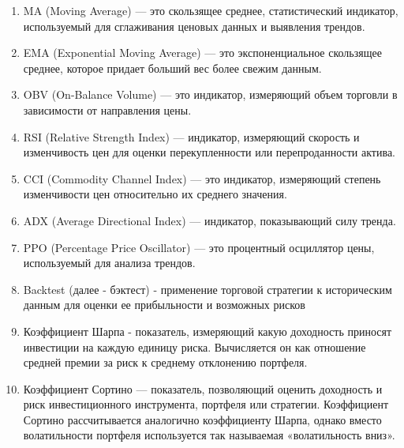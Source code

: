 \documentclass[a4paper,14pt]{extarticle}
\begin{document}
\begin{enumerate}
\item MA (Moving Average) — это скользящее среднее, статистический индикатор, используемый для сглаживания ценовых данных и выявления трендов.
\item EMA (Exponential Moving Average) — это экспоненциальное скользящее среднее, которое придает больший вес более свежим данным.
\item OBV (On-Balance Volume) — это индикатор, измеряющий объем торговли в зависимости от направления цены.
\item RSI (Relative Strength Index) — индикатор, измеряющий скорость и изменчивость цен для оценки перекупленности или перепроданности актива.
\item CCI (Commodity Channel Index) — это индикатор, измеряющий степень изменчивости цен относительно их среднего значения.
\item ADX (Average Directional Index) — индикатор, показывающий силу тренда.
\item PPO (Percentage Price Oscillator) — это процентный осциллятор цены, используемый для анализа трендов.
\item Backtest (далее - бэктест) - применение торговой стратегии к историческим данным для оценки ее прибыльности и возможных рисков
\item Коэффициент Шарпа - показатель, измеряющий какую доходность приносят инвестиции на каждую единицу риска. Вычисляется он как отношение средней премии за риск к среднему отклонению портфеля.
\item Коэффициент Сортино — показатель, позволяющий оценить доходность и риск инвестиционного инструмента, портфеля или стратегии. Коэффициент Сортино рассчитывается аналогично коэффициенту Шарпа, однако вместо волатильности портфеля используется так называемая «волатильность вниз».

\end{enumerate}
\end{document}
